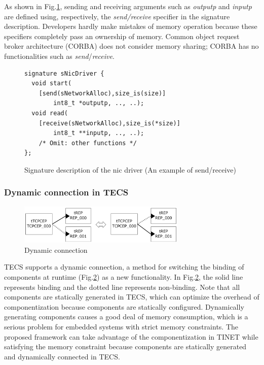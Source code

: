 \documentclass[JIP]{ipsj_v2/UTF8/ipsj}
\begin{document}
As shown in Fig.\ref{src:SendReceive}, sending and receiving arguments such as {\it outputp} and {\it inputp} are defined using, respectively, the {\it send/receive} specifier in the signature description.
Developers hardly make mistakes of memory operation because these specifiers completely pass an ownership of memory.
Common object request broker architecture (CORBA) does not consider memory sharing; CORBA has no functionalities
such as {\it send}/{\it receive}.

\begin{figure}[t]
\centering
\begin{lstlisting}
signature sNicDriver {
  void start(
    [send(sNetworkAlloc),size_is(size)]
        int8_t *outputp, .., ..);
  void read(
    [receive(sNetworkAlloc),size_is(*size)]
        int8_t **inputp, .., ..);
    /* Omit: other functions */
};
\end{lstlisting}
\caption{Signature description of the nic driver (An example of send/receive)}
\label{src:SendReceive}
\end{figure}

\subsubsection{Dynamic connection in TECS}
\label{sec:DynamicConnection}

\begin{figure}[t]
    \centering
    \includegraphics[width=8cm,clip]{figure/DynamicConnection.pdf}
    \caption{Dynamic connection}
    \label{fig:DynamicConnection}
\end{figure}

TECS supports a dynamic connection, a method for switching the binding of components at runtime (Fig.\ref{fig:DynamicConnection}) as a new functionality.
In Fig.\ref{fig:DynamicConnection}, the solid line represents binding and the dotted line represents non-binding.
Note that all components are statically generated in TECS, which can optimize the overhead of componentization because components are statically configured.
Dynamically generating components causes a good deal of memory consumption, which is a serious problem for embedded systems with strict memory constraints.
The proposed framework can take advantage of the componentization in TINET while satisfying the memory constraint because components are statically generated and dynamically connected in TECS.
\end{document}
